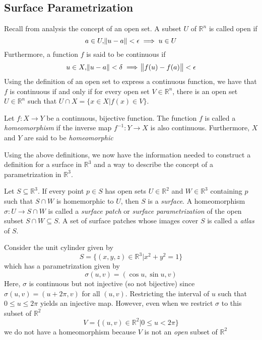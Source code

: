 
\subsection{Surface Parametrization}

Recall from analysis the concept of an open set. A subset \(U\) of \(\mathbb{R}^{n}\) is called open if
\[
a\in U, \norm{u - a} < \epsilon \implies u\in U
\]
Furthermore, a function \(f\) is said to be continuous if
\[
u\in X, \norm{u - a}<\delta \implies \norm{f(u)-f(a)}<\epsilon
\]
Using the definition of an open set to express a continuous function, we have that \(f\) is continuous if and only if for every open set \(V\in \mathbb{R}^{n}\), there is an open set \(U\in \mathbb{R}^{n}\) such that \(U \cap X = \{x\in X| f(x) \in V\}\).

\begin{definition}
  Let \(f \colon X \rightarrow Y\) be a continuous, bijective function. The function \(f\) is called a \textit{homeomorphism} if the inverse map \(f^{-1} \colon Y \rightarrow X\) is also continuous. Furthermore, \(X\) and \(Y\) are said to be \textit{homeomorphic}
\end{definition}

Using the above definitions, we now have the information needed to construct a definition for a surface in \(\mathbb{R}^{3}\) and a way to describe the concept of a parametrization in \(\mathbb{R}^{3}\).

\begin{definition}
  Let \(S \subseteq \mathbb{R}^{3}\). If every point \(p\in S\) has open sets \(U\in \mathbb{R}^{2}\) and \(W\in \mathbb{R}^{3}\) containing \(p\) such that \(S\cap W\) is homemorphic to \(U\), then \(S\) is a \textit{surface}. A homeomorphism \(\sigma \colon U \rightarrow S\cap W\) is called a \textit{surface patch} or \textit{surface parametrization} of the open subset \(S\cap W\subseteq S\). A set of surface patches whose images cover \(S\) is called a \textit{atlas} of \(S\).
\end{definition}

\begin{example}
  Consider the unit cylinder given by
  \[
S = \{(x, y, z)\in \mathbb{R}^{3}| x^{2} + y^{2} = 1\}
\]
  which has a parametrization given by
  \[
\sigma(u, v) = (\cos u, \sin u, v)
\]
  Here, \(\sigma\) is continuous but not injective (so not bijective) since \(\sigma(u,v) = (u + 2\pi, v)\) for all \((u, v)\).
  Restricting the interval of \(u\) such that \(0\leq u\leq 2\pi\) yields an injective map. However, even when we restrict \(\sigma\) to this subset of \(\mathbb{R}^{2}\)
  \[
V = \{(u, v)\in \mathbb{R}^{2}| 0 \leq u < 2\pi\}
\]
  we do not have a homeomorphism because \(V\) is not an \textit{open} subset of \(\mathbb{R}^{2}\)
\end{example}

